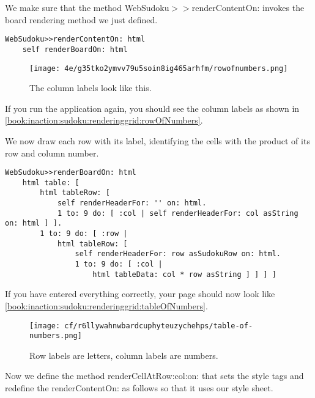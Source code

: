 \documentclass[a4paper,10pt,twoside]{book}
\newcommand{\ct}[1]{{\small\ttfamily\textup{#1}}}
\begin{document}
We make sure that the method \ct{WebSudoku$>$$>$renderContentOn:} invokes the board rendering method we just defined.

\begin{lstlisting}
WebSudoku>>renderContentOn: html
    self renderBoardOn: html
\end{lstlisting}

\begin{figure}[h!tbp]
	\begin{center}
		\texttt{[image: 4e/g35tko2ymvv79u5soin8ig465arhfm/rowofnumbers.png]}
		\caption{The column labels look like this.\label{book:inaction:sudoku:renderinggrid:rowOfNumbers}}
	\end{center}
\end{figure}


If you run the application again, you should see the column labels as shown in \autoref{book:inaction:sudoku:renderinggrid:rowOfNumbers}.

We now draw each row with its label, identifying the cells with the product of its row and column number.

\begin{lstlisting}
WebSudoku>>renderBoardOn: html
    html table: [
        html tableRow: [ 
            self renderHeaderFor: '' on: html.
            1 to: 9 do: [ :col | self renderHeaderFor: col asString on: html ] ].
        1 to: 9 do: [ :row |
            html tableRow: [
                self renderHeaderFor: row asSudokuRow on: html.
                1 to: 9 do: [ :col | 
                    html tableData: col * row asString ] ] ] ]  
\end{lstlisting}

If you have entered everything correctly, your page should now look like \autoref{book:inaction:sudoku:renderinggrid:tableOfNumbers}.

\begin{figure}[h!tbp]
	\begin{center}
		\texttt{[image: cf/r6llywahnwbardcuphyteuzychehps/table-of-numbers.png]}
		\caption{Row labels are letters, column labels are numbers.\label{book:inaction:sudoku:renderinggrid:tableOfNumbers}}
	\end{center}
\end{figure}


Now we define the method \ct{renderCellAtRow:col:on:} that sets the style tags and redefine the \ct{renderContentOn:} as follows so that it uses our style sheet.
\end{document}
